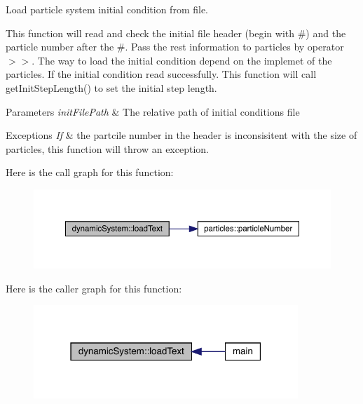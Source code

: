 Load particle system initial condition from file. 

This function will read and check the initial file header (begin with \textquotesingle{}\#\textquotesingle{}) and the particle number after the \textquotesingle{}\#\textquotesingle{}. Pass the rest information to particles by operator \textquotesingle{}$>$$>$\textquotesingle{}. The way to load the initial condition depend on the implemet of the particles. If the initial condition read successfully. This function will call get\+Init\+Step\+Length() to set the initial step length.


\begin{DoxyParams}{Parameters}
{\em init\+File\+Path} & The relative path of initial conditions file \\
\hline
\end{DoxyParams}

\begin{DoxyExceptions}{Exceptions}
{\em If} & the partcile number in the header is inconsisitent with the size of particles, this function will throw an exception. \\
\hline
\end{DoxyExceptions}
Here is the call graph for this function\+:\nopagebreak
\begin{figure}[H]
\begin{center}
\leavevmode
\includegraphics[width=350pt]{classdynamic_system_a3ff4342241733e94edce17c1a79a90a8_cgraph}
\end{center}
\end{figure}
Here is the caller graph for this function\+:
\nopagebreak
\begin{figure}[H]
\begin{center}
\leavevmode
\includegraphics[width=283pt]{classdynamic_system_a3ff4342241733e94edce17c1a79a90a8_icgraph}
\end{center}
\end{figure}
\mbox{\label{classdynamic_system_a0392d5b36a03692d65616f3b40168948}} 
